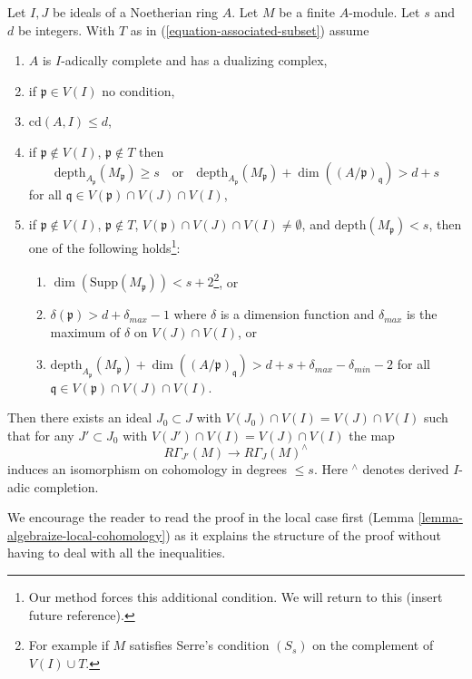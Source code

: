 \begin{lemma}
\label{lemma-algebraize-local-cohomology-general}
Let $I, J$ be ideals of a Noetherian ring $A$.
Let $M$ be a finite $A$-module.
Let $s$ and $d$ be integers. With $T$ as in
(\ref{equation-associated-subset}) assume
\begin{enumerate}
\item $A$ is $I$-adically complete and has a dualizing complex,
\item if $\mathfrak p \in V(I)$ no condition,
\item $\text{cd}(A, I) \leq d$,
\item if $\mathfrak p \not \in V(I)$, $\mathfrak p \not \in T$ then
$$
\text{depth}_{A_\mathfrak p}(M_\mathfrak p) \geq s
\quad\text{or}\quad
\text{depth}_{A_\mathfrak p}(M_\mathfrak p) +
\dim((A/\mathfrak p)_\mathfrak q) > d + s
$$
for all $\mathfrak q \in V(\mathfrak p) \cap V(J) \cap V(I)$,
\item if $\mathfrak p \not \in V(I)$, $\mathfrak p \not \in T$,
$V(\mathfrak p) \cap V(J) \cap V(I) \not = \emptyset$, and
$\text{depth}(M_\mathfrak p) < s$, then one
of the following holds\footnote{Our method
forces this additional condition. We will return to this
(insert future reference).}:
\begin{enumerate}
\item $\dim(\text{Supp}(M_\mathfrak p)) < s + 2$\footnote{For example
if $M$ satisfies Serre's condition $(S_s)$
on the complement of $V(I) \cup T$.}, or
\item  $\delta(\mathfrak p) > d + \delta_{max} - 1$
where $\delta$ is a dimension function and $\delta_{max}$
is the maximum of $\delta$ on $V(J) \cap V(I)$, or
\item $\text{depth}_{A_\mathfrak p}(M_\mathfrak p) +
\dim((A/\mathfrak p)_\mathfrak q) > d + s + \delta_{max} - \delta_{min} - 2$
for all $\mathfrak q \in V(\mathfrak p) \cap V(J) \cap V(I)$.
\end{enumerate}
\end{enumerate}
Then there exists an ideal $J_0 \subset J$ with
$V(J_0) \cap V(I) = V(J) \cap V(I)$
such that for any $J' \subset J_0$ with
$V(J') \cap V(I) = V(J) \cap V(I)$ the map
$$
R\Gamma_{J'}(M) \longrightarrow R\Gamma_J(M)^\wedge
$$
induces an isomorphism on cohomology in degrees $\leq s$.
Here ${}^\wedge$ denotes derived $I$-adic completion.
\end{lemma}

\noindent
We encourage the reader to read the proof in the local case first
(Lemma \ref{lemma-algebraize-local-cohomology}) as it explains the structure
of the proof without having to deal with all the inequalities.

